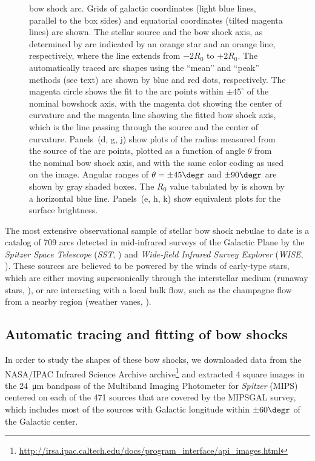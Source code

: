 \documentclass[useAMS, usenatbib, a4paper]{mnras}
\newcommand\hii{\ion{H}{ii}}
\begin{document}
\begin{figure}
{    bow shock arc. Grids of galactic coordinates (light blue lines,
    parallel to the box sides) and equatorial coordinates (tilted
    magenta lines) are shown.  The stellar source and the bow shock
    axis, as determined by \citet{Kobulnicky:2016a} are indicated by
    an orange star and an orange line, respectively, where the line
    extends from \(-2 R_0\) to \(+2 R_0\).  The automatically traced
    arc shapes using the ``mean'' and ``peak'' methods (see text) are
    shown by blue and red dots, respectively.  The magenta circle
    shows the fit to the arc points within \(\pm 45^\circ\) of the nominal
    bowshock axis, with the magenta dot showing the center of
    curvature and the magenta line showing the fitted bow shock axis,
    which is the line passing through the source and the center of
    curvature. 
    Panels~(d, g, j) show plots of the radius measured from the source
    of the arc points, plotted as a function of angle \(\theta\) from the
    nominal bow shock axis, and with the same color coding as used on
    the image. Angular ranges of \(\theta = \pm 45\degr\) and
    \(\pm 90\degr\) are shown by gray shaded boxes.  The \(R_0\) value
    tabulated by \citet{Kobulnicky:2016a} is shown by a horizontal
    blue line. 
    Panels~(e, h, k) show equivalent plots for the surface brightness.
  }
  \label{fig:mipsgal-examples}
\end{figure}


The most extensive observational sample of stellar bow shock nebulae
to date is a catalog of 709 arcs \citep{Kobulnicky:2016a} detected in
mid-infrared surveys of the Galactic Plane by the \textit{Spitzer
  Space Telescope} (\textit{SST}, \citealp{Werner:2004a}) and
\textit{Wide-field Infrared Survey Explorer} (\textit{WISE},
\citealp{Wright:2010a}).  These sources are believed to be powered by
the winds of early-type stars, which are either moving supersonically
through the interstellar medium (runaway stars,
\citealp{Gvaramadze:2008a}), or are interacting with a local bulk
flow, such as the champagne flow from a nearby \hii{} region (weather
vanes, \citealp{Povich:2008a}).


\subsection{Automatic tracing and fitting of bow shocks}
\label{sec:autom-trac-fitt}


In order to study the shapes of these bow shocks, we downloaded data
from the NASA/IPAC Infrared Science Archive archive\footnote{
  \url{http://irsa.ipac.caltech.edu/docs/program_interface/api_images.html}}
and extracted 4\arcmin{} square images in the \SI{24}{\um} bandpass of
the Multiband Imaging Photometer for \textit{Spitzer} (MIPS) centered
on each of the 471 \citet{Kobulnicky:2016a} sources that are covered
by the MIPSGAL \citep{Carey:2009a} survey, which includes most of the
sources with Galactic longitude within \(\pm 60\degr\) of the Galactic
center.
\end{document}
